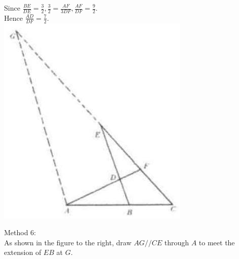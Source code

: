 \documentclass{article}
\begin{document}
Since \(\frac{B E}{D E}=\frac{3}{2}, \frac{3}{2}=\frac{A F}{3 D F}, \frac{A F}{D F}=\frac{9}{2}\).\\
Hence \(\frac{A D}{D F}=\frac{7}{2}\).\\
\centering
\includegraphics[width=\textwidth]{images/113.jpg}

Method 6:\\
As shown in the figure to the right, draw \(A G / / C E\) through \(A\) to meet the extension of \(E B\) at \(G\).
\end{document}
